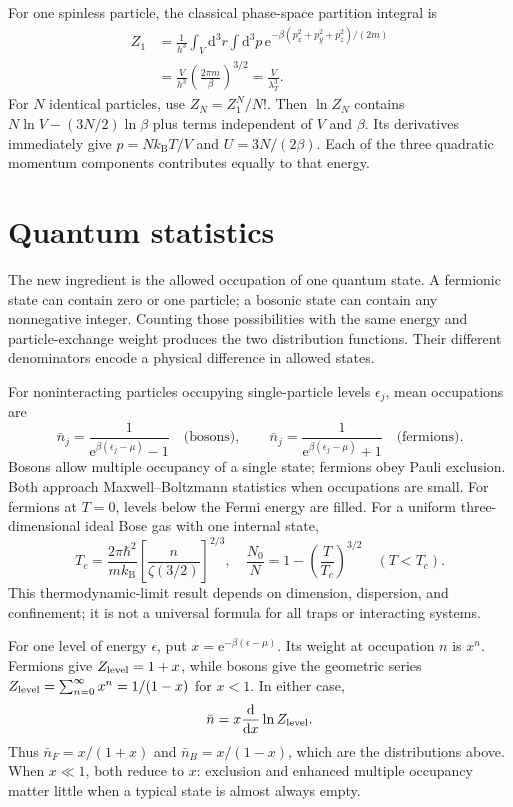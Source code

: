 \documentclass[11pt,oneside]{book}
\newcommand{\dd}{\mathrm{d}}
\newcommand{\ee}{\mathrm{e}}
\newcommand{\od}[2]{\frac{\dd #1}{\dd #2}}
\newcommand{\kb}{k_{\mathrm B}}
\theoremstyle{reviewstyle}
\begin{document}
For one spinless particle, the classical phase-space partition integral is
\begin{align}
Z_1&=\frac1{h^3}\int_V\dd^3r\int\dd^3p\,
\ee^{-\beta(p_x^2+p_y^2+p_z^2)/(2m)}\\
&=\frac{V}{h^3}\left(\frac{2\pi m}{\beta}\right)^{3/2}
=\frac{V}{\lambda_T^3}.
\end{align}
For $N$ identical particles, use $Z_N=Z_1^N/N!$. Then $\ln Z_N$ contains $N\ln V-(3N/2)\ln\beta$ plus terms independent of $V$ and $\beta$. Its derivatives immediately give $p=N\kb T/V$ and $U=3N/(2\beta)$. Each of the three quadratic momentum components contributes equally to that energy.

\section{Quantum statistics}
The new ingredient is the allowed occupation of one quantum state. A fermionic state can contain zero or one particle; a bosonic state can contain any nonnegative integer. Counting those possibilities with the same energy and particle-exchange weight produces the two distribution functions. Their different denominators encode a physical difference in allowed states.

For noninteracting particles occupying single-particle levels $\epsilon_j$, mean occupations are
\begin{equation}
\bar n_j=\frac1{\ee^{\beta(\epsilon_j-\mu)}-1}\quad\text{(bosons)},\qquad
\bar n_j=\frac1{\ee^{\beta(\epsilon_j-\mu)}+1}\quad\text{(fermions)}.
\end{equation}
Bosons allow multiple occupancy of a single state; fermions obey Pauli exclusion. Both approach Maxwell--Boltzmann statistics when occupations are small. For fermions at $T=0$, levels below the Fermi energy are filled. For a uniform three-dimensional ideal Bose gas with one internal state,
\begin{equation}
T_c=\frac{2\pi\hbar^2}{m\kb}\left[\frac{n}{\zeta(3/2)}\right]^{2/3},\quad
\frac{N_0}{N}=1-\left(\frac{T}{T_c}\right)^{3/2}\quad(T<T_c).
\end{equation}
This thermodynamic-limit result depends on dimension, dispersion, and confinement; it is not a universal formula for all traps or interacting systems.

For one level of energy $\epsilon$, put $x=\ee^{-\beta(\epsilon-\mu)}$. Its weight at occupation $n$ is $x^n$. Fermions give $Z_{\rm level}=1+x$, while bosons give the geometric series $Z_{\rm level}=\sum_{n=0}^\infty x^n=1/(1-x)$ for $x<1$. In either case,
\begin{equation}
\bar n=x\od{}{x}\ln Z_{\rm level}.
\end{equation}
Thus $\bar n_F=x/(1+x)$ and $\bar n_B=x/(1-x)$, which are the distributions above. When $x\ll1$, both reduce to $x$: exclusion and enhanced multiple occupancy matter little when a typical state is almost always empty.
\end{document}
